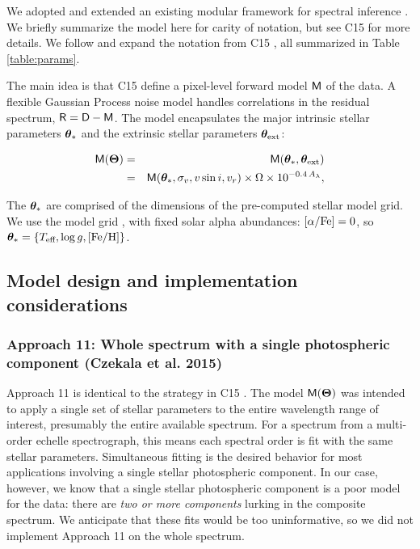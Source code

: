 \documentclass[onecolumn]{emulateapj}%
\newcommand{\iancze}{{\sc C15 }}
\begin{document}

We adopted and extended an existing modular framework for spectral inference \citep[][hereafter \iancze]{2015ApJ...812..128C}.  We briefly summarize the model here for carity of notation, but see \iancze for more details.  We follow and expand the notation from \iancze, all summarized in Table \ref{table:params}. 

The main idea is that \iancze define a pixel-level forward model $\mathsf{M}$ of the data.  A flexible Gaussian Process noise model handles correlations in the residual spectrum, $\mathsf{R}= \mathsf{D} - \mathsf{M}$.  The model encapsulates the major intrinsic stellar parameters ${\bm \theta}_{\ast}$ and the extrinsic stellar parameters ${\bm \theta}_{\rm ext}$:

\begin{eqnarray} \label{eqn:scaling}
\mathsf{M}({\bm \Theta}) &=& \mathsf{M}({\bm \theta}_{\ast}, {\bm \theta}_{\rm ext}) \\
         &=& \mathsf{M}({\bm \theta}_{\ast}, \sigma_v, v\sin{i}, v_r) \times \Omega \times 10^{-0.4\,A_{\lambda}}, \nonumber
\end{eqnarray}

The ${\bm \theta}_{\ast}$ are comprised of the dimensions of the pre-computed stellar model grid.  We use the \PHOENIX model grid \citep{2013A&A...553A...6H}, with fixed solar alpha abundances: $[\alpha/{\rm Fe}] = 0$, so ${\bm \theta}_{\ast} = \{T_\textrm{eff}, \log g, [{\rm Fe}/{\rm H}] \}$.

\subsection{Model design and implementation considerations}

\subsubsection{Approach 11: Whole spectrum with a single photospheric component (Czekala et al. 2015)}

Approach 11 is identical to the strategy in \iancze.  The model $\mathsf{M}({\bm \Theta})$ was intended to apply a single set of stellar parameters to the entire wavelength range of interest, presumably the entire available spectrum.  For a spectrum from a multi-order echelle spectrograph, this means each spectral order is fit with the same stellar parameters.  Simultaneous fitting is the desired behavior for most applications involving a single stellar photospheric component.  In our case, however, we know that a single stellar photospheric component is a poor model for the data: there are \emph{two or more components} lurking in the composite spectrum.  We anticipate that these fits would be too uninformative, so we did not implement Approach 11 on the whole spectrum.
\end{document}
